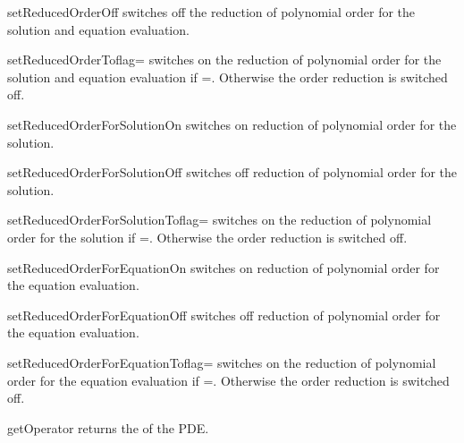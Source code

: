 \begin{methoddesc}[LinearPDE]{setReducedOrderOff}{}
switches off the reduction of polynomial order for the solution and 
equation evaluation.
\end{methoddesc}

\begin{methoddesc}[LinearPDE]{setReducedOrderTo}{flag=\False}
switches on the reduction of polynomial order for the solution and 
equation evaluation if =\True. Otherwise
the order reduction is switched off.
\end{methoddesc}

\begin{methoddesc}[LinearPDE]{setReducedOrderForSolutionOn}{}
switches on reduction of polynomial order for the solution.
\end{methoddesc}

\begin{methoddesc}[LinearPDE]{setReducedOrderForSolutionOff}{}
switches off reduction of polynomial order for the solution.
\end{methoddesc}

\begin{methoddesc}[LinearPDE]{setReducedOrderForSolutionTo}{flag=\False}
switches on the reduction of polynomial order for the solution 
if =\True. Otherwise
the order reduction is switched off.
\end{methoddesc}

\begin{methoddesc}[LinearPDE]{setReducedOrderForEquationOn}{}
switches on reduction of polynomial order for the equation evaluation.
\end{methoddesc}

\begin{methoddesc}[LinearPDE]{setReducedOrderForEquationOff}{}
switches off reduction of polynomial order for the equation evaluation.
\end{methoddesc}

\begin{methoddesc}[LinearPDE]{setReducedOrderForEquationTo}{flag=\False}
switches on the reduction of polynomial order for the equation 
evaluation if =\True. Otherwise
the order reduction is switched off.
\end{methoddesc}

\begin{methoddesc}[LinearPDE]{getOperator}{}
returns the \Operator of the PDE.
\end{methoddesc}

